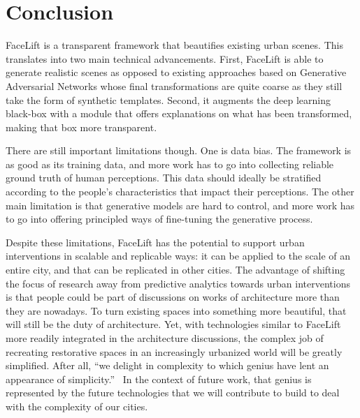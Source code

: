 \section{Conclusion}
\label{sec:discussion}

FaceLift is a transparent framework that beautifies existing urban scenes. This translates into two main technical advancements. First, FaceLift is able to generate realistic scenes as opposed to existing approaches based on  Generative Adversarial Networks whose final transformations are quite coarse as they still take the form of synthetic templates.  Second, it augments the deep learning black-box with a module that offers explanations on what has been transformed, making that box more transparent. 

There are still important limitations though. One is data bias. The framework is as good as its training data, and more work has to go into collecting reliable ground truth of human perceptions. This data should ideally be stratified according to the people's characteristics that  impact their perceptions. The other main limitation is that generative models are hard to control, and more work has to go into offering principled ways of fine-tuning the generative process.

Despite these limitations, FaceLift has the potential to support urban interventions  in scalable  and replicable ways: it can be applied to the scale of an entire city, and that  can be replicated in other cities. The advantage of shifting the focus of research away from predictive analytics towards urban interventions is that people could be part of discussions on works of architecture  more than they are nowadays. To turn existing spaces into something more beautiful, that will still be the duty of architecture. Yet, with technologies similar to FaceLift more readily integrated in the architecture discussions, the complex job of recreating restorative spaces in an increasingly urbanized world will be greatly simplified.  After all, ``we delight in complexity to which genius have lent an appearance of simplicity.''~\cite{de2008architecture} In the context of future work, that genius is represented by the future technologies that we will contribute to build to deal with the complexity of our cities.



